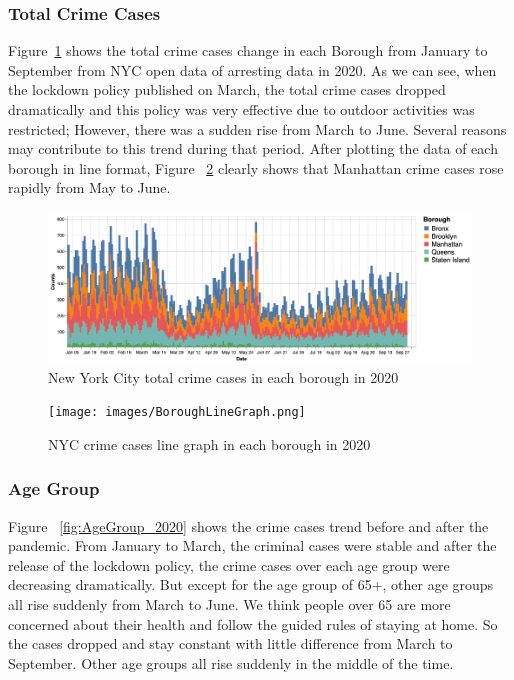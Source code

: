 \documentclass[conference]{IEEEtran}
\begin{document}
\subsubsection{Total Crime Cases}
Figure~\ref{fig:totalCrimeCases_2020} shows the total crime cases change in each Borough from January to September from NYC open data of arresting data in 2020. As we can see, when the lockdown policy published on March, the total crime cases dropped dramatically and this policy was very effective due to outdoor activities was restricted; However, there was a sudden rise from March to June. Several reasons may contribute to this trend during that period. After plotting the data of each borough in line format,  Figure ~\ref{fig:BoroughLineGraph} clearly shows that Manhattan crime cases rose rapidly from May to June.


\begin{figure}[ht!]
    \centering
    \includegraphics[width=\linewidth]{images/totalCrimeCases.png}
    \caption{New York City total crime cases in each borough in 2020}
    \label{fig:totalCrimeCases_2020}
\end{figure}

\begin{figure}[ht!]
    \centering
    \texttt{[image: images/BoroughLineGraph.png]}
    \caption{NYC crime cases line graph in each borough in 2020}
    \label{fig:BoroughLineGraph}
\end{figure}

\subsubsection{Age Group}
Figure ~\ref{fig:AgeGroup_2020} shows the crime cases trend before and after the pandemic.  From January to March, the criminal cases were stable and after the release of the lockdown policy, the crime cases over each age group were decreasing dramatically. But except for the age group of 65+,  other age groups all rise suddenly from March to June. We think people over 65 are more concerned about their health and follow the guided rules of staying at home. So the cases dropped and stay constant with little difference from March to September. Other age groups all rise suddenly in the middle of the time.
\end{document}

